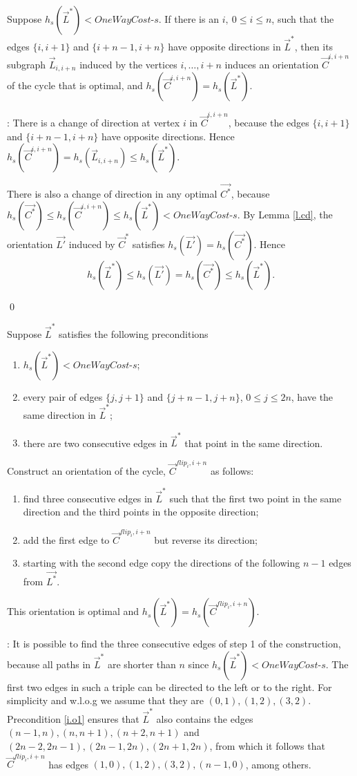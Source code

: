 \begin{lemma}\label{l.subo}
	Suppose $h_s(\vec{L}^*) < \textit{OneWayCost-s}$.
	If there is an $i,\ 0\leq i \leq n$, such that the edges $\{i,i+1\}$ and $\{i+n-1,i+n\}$ 
	have opposite directions in $\vec{L}^*$,
	then its subgraph $\vec{L}_{i,i+n}$ induced by the vertices $i,\ldots,i+n$ induces
	an orientation $\vec{C}^{i, i+n}$ of the cycle that is optimal, and $h_s(\vec{C}^{i, i+n})= h_s(\vec{L}^*)$.
\end{lemma}
:
There is a change of direction at vertex $i$ in $\vec{C}^{i, i+n}$,
because the edges $\{i,i+1\}$ and $\{i+n-1,i+n\}$ have opposite directions.
Hence $h_s(\vec{C}^{i, i+n}) =h_s(\vec{L}_{i,i+n})\leq h_s(\vec{L}^*)$.

There is also a change of direction in any optimal $\vec{C^*}$, because 
$h_s(\vec{C^*}) \leq h_s(\vec{C}^{i, i+n})  \leq h_s(\vec{L}^*)<\textit{OneWayCost-s}$. 
By Lemma \ref{l.cd},  the orientation $\vec{L'}$ induced by $\vec{C}^*$
satisfies $h_s(\vec{L'})= h_s(\vec{C^*})$. Hence
$$h_s(\vec{L}^*)\leq h_s(\vec{L'})= h_s(\vec{C^*})\leq h_s(\vec{L}^*) .$$

\qed

\begin{lemma}\label{l.last}
	Suppose $\vec{L}^*$ satisfies the following preconditions 
	\begin{enumerate}
		\item $h_s(\vec{L}^*) < \textit{OneWayCost-s}$;
		\item \label{i.o1}every pair of edges $\{j,j+1\}$ and $\{j+n-1,j+n\}$, $0\leq j \leq 2n$,
		 have the same direction in $\vec{L}^*$;
		\item there are two consecutive edges in  $\vec{L}^*$ that point in the same direction.
	\end{enumerate} 
Construct an orientation of the cycle, $\vec{C}^{flip_i, i+n}$ as follows:
\begin{enumerate}
	\item find three consecutive edges in $\vec{L}^*$ such that the first two point in the same direction and the third points in the opposite direction;
	\item add the first edge to $\vec{C}^{flip_i, i+n}$ but reverse its direction;
	\item starting with the second edge copy the directions of the following $n-1$ edges 
	from $\vec{L^*}$.
\end{enumerate}
This orientation is optimal and $h_s(\vec{L}^*) = h_s(\vec{C}^{flip_i, i+n})$.
	\end{lemma}
: 
It is possible to find the three consecutive edges of step 1 of the construction, because 
all paths in $\vec{L}^*$ are shorter than $n$ since $h_s(\vec{L}^*) < \textit{OneWayCost-s}$.
The first two edges in such a triple can be directed to the left or to the right.
For simplicity and w.l.o.g we assume that they are $(0,1), (1,2),(3,2)$. Precondition
	 \ref{i.o1} ensures that $\vec{L}^*$ also contains the edges $(n-1,n),(n,n+1),(n+2,n+1)$ and $(2n-2,2n-1),(2n-1,2n), (2n+1,2n) $, from which it follows that $\vec{C}^{flip_i, i+n}$ has edges 
	 $(1,0), (1,2),(3,2),(n-1,0)$, among others.
	

